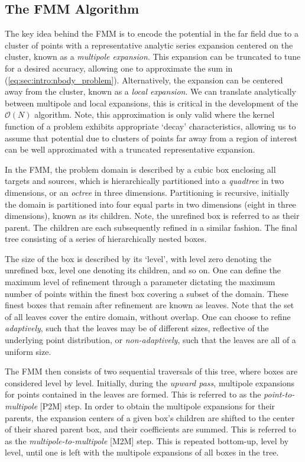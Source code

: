 \documentclass{IEEEcsmag}
\begin{document}
\subsection{The FMM Algorithm}\label{sec:intro:algorithm}

The key idea behind the FMM is to encode the potential in the far field due to a cluster of points with a representative analytic series expansion centered on the cluster, known as a \textit{multipole expansion}. This expansion can be truncated to tune for a desired accuracy, allowing one to approximate the sum in (\ref{eq:sec:intro:nbody_problem}). Alternatively, the expansion can be centered away from the cluster, known as a \textit{local expansion}. We can translate analytically between multipole and local expansions, this is critical in the development of the $\mathcal{O}(N)$ algorithm. Note, this approximation is only valid where the kernel function of a problem exhibits appropriate `decay' characteristics, allowing us to assume that potential due to clusters of points far away from a region of interest can be well approximated with a truncated representative expansion.

In the FMM, the problem domain is described by a cubic box enclosing all targets and sources, which is hierarchically partitioned into a \textit{quadtree} in two dimensions, or an \textit{octree} in three dimensions. Partitioning is recursive, initially the domain is partitioned into four equal parts in two dimensions (eight in three dimensions), known as its children. Note, the unrefined box is referred to as their parent. The children are each subsequently refined in a similar fashion. The final tree consisting of a series of hierarchically nested boxes.

The size of the box is described by its `level', with level zero denoting the unrefined box, level one denoting its children, and so on. One can define the maximum level of refinement through a parameter dictating the maximum number of points within the finest box covering a subset of the domain. These finest boxes that remain after refinement are known as leaves. Note that the set of all leaves cover the entire domain, without overlap. One can choose to refine \textit{adaptively}, such that the leaves may be of different sizes, reflective of the underlying point distribution, or \textit{non-adaptively}, such that the leaves are all of a uniform size.

The FMM then consists of two sequential traversals of this tree, where boxes are considered level by level. Initially, during the \textit{upward pass}, multipole expansions for points contained in the leaves are formed. This is referred to as the \textit{point-to-multipole} [P2M] step. In order to obtain the multipole expansions for their parents, the expansion centers of a given box's children are shifted to the center of their shared parent box, and their coefficients are summed. This is referred to as the \textit{multipole-to-multipole} [M2M] step. This is repeated bottom-up, level by level, until one is left with the multipole expansions of all boxes in the tree.
\end{document}
